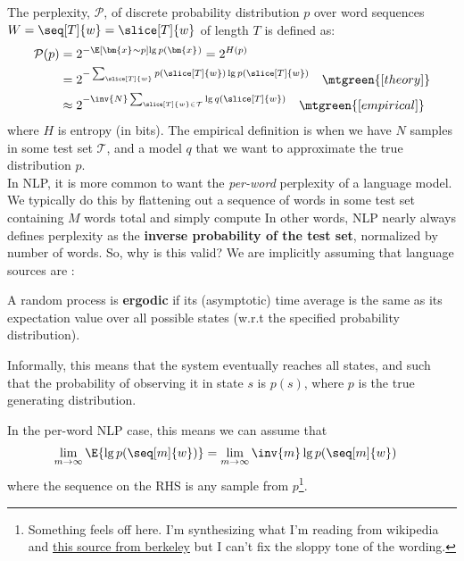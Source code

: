 \documentclass[11pt]{article}
\renewcommand\vec[2][]{\bm{#2}_{#1}}
\begin{document}
The perplexity, $\mathcal P$, of discrete probability distribution $p$ over word sequences $W = \seq[T]{w} = \slice[T]{w}$ of length $T$ is defined as:
\begin{align}
	\mathcal P (p)
		&= 2^{ - \E[\vec x \sim p]{\lg p(\vec x)} }  = 2^{H(p)} \\
		&= 2^{-\sum_{ \slice[T]{w} } p( \slice[T]{w} ) \lg p( \slice[T]{w} ) } \quad \mtgreen{[theory]} \\
		&\approx 2^{- \inv{N} \sum_{ \slice[T]{w} \in \mathcal T  }  \lg q( \slice[T]{w} ) } \quad \mtgreen{[empirical]}
\end{align}
where $H$ is entropy (in bits). The empirical definition is when we have $N$ samples in some test set $\mathcal T$, and a model $q$ that we want to approximate the true distribution $p$. \\

In NLP, it is more common to want the \textit{per-word} perplexity of a language model. We typically do this by flattening out a sequence of words in some test set containing $M$ words total and simply compute
In other words, NLP nearly always defines perplexity as the \textbf{inverse probability of the test set}, normalized by number of words. So, why is this valid? We are implicitly assuming that language sources are :

\begin{definition}[-1em][Ergodic]
	A random process is \textbf{ergodic} if its (asymptotic) time average is the same as its expectation value over all possible states (w.r.t the specified probability distribution). 
	
	Informally, this means that the system eventually reaches all states, and such that the probability of observing it in state $s$ is $p(s)$, where $p$ is the true generating distribution. 
\end{definition}
In the per-word NLP case, this means we can assume that
\begin{align}
	\lim_{m \rightarrow \infty} \E{\lg p(\seq[m]{w})}
		&=
	\lim_{m \rightarrow \infty} \inv{m} \lg p(\seq[m]{w})
\end{align}
where the sequence on the RHS is any sample from $p$\footnote{Something feels off here. I'm synthesizing what I'm reading from wikipedia and \href{http://www1.icsi.berkeley.edu/Speech/docs/HTKBook3.2/node188_mn.html}{this source from berkeley} but I can't fix the sloppy tone of the wording.}.
\end{document}
